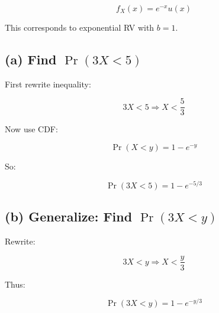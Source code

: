 \documentclass[12pt]{article}
\begin{document}
\[
f_X(x) = e^{-x} u(x)
\]

This corresponds to exponential RV with \( b = 1 \).

\subsection*{(a) Find \( \Pr(3X < 5) \)}

First rewrite inequality:

\[
3X < 5 \Rightarrow X < \frac{5}{3}
\]

Now use CDF:

\[
\Pr(X < y) = 1 - e^{-y}
\]

So:

\[
\Pr(3X < 5) = 1 - e^{-5/3}
\]

\subsection*{(b) Generalize: Find \( \Pr(3X < y) \)}

Rewrite:

\[
3X < y \Rightarrow X < \frac{y}{3}
\]

Thus:

\[
\Pr(3X < y) = 1 - e^{-y/3}
\]
\end{document}
